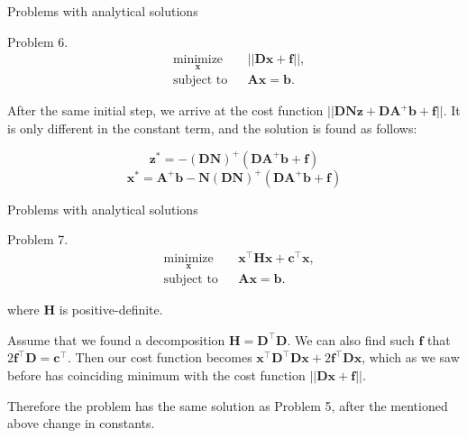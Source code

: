 \documentclass{beamer}
\begin{document}
\begin{frame}{Problems with analytical solutions}
\begin{flushleft}

Problem 6. 
%
\begin{equation}
\begin{aligned}
& \underset{\mathbf{x}}{\text{minimize}}
& & || \mathbf{D}\mathbf{x} + \mathbf{f} ||, \\
& \text{subject to}
& & \mathbf{A} \mathbf{x} = \mathbf{b}.
\end{aligned}
\end{equation}

After the same initial step, we arrive at the cost function $|| \mathbf{D}\mathbf{N}\mathbf{z} + \mathbf{D}\mathbf{A}^+\mathbf{b} + \mathbf{f}||$. It is only different in the constant term, and the solution is found as follows:


\begin{equation}
    \mathbf{z}^* = -(\mathbf{D}\mathbf{N})^+ (\mathbf{D}\mathbf{A}^+\mathbf{b} + \mathbf{f})
\end{equation}
\begin{equation}
    \mathbf{x}^* = \mathbf{A}^+\mathbf{b}-\mathbf{N}(\mathbf{D}\mathbf{N})^+ (\mathbf{D}\mathbf{A}^+\mathbf{b} + \mathbf{f})
\end{equation}


\end{flushleft}
\end{frame}



\begin{frame}{Problems with analytical solutions}
\begin{flushleft}

Problem 7. 
%
\begin{equation}
\begin{aligned}
& \underset{\mathbf{x}}{\text{minimize}}
& & \mathbf{x}^\top \mathbf{H} \mathbf{x} + \mathbf{c}^\top\mathbf{x}, \\
& \text{subject to}
& & \mathbf{A} \mathbf{x} = \mathbf{b}.
\end{aligned}
\end{equation}

where $\mathbf{H}$ is positive-definite.

\bigskip

Assume that we found a decomposition $\mathbf{H} = \mathbf{D}^\top\mathbf{D}$. We can also find such $\mathbf{f}$ that $2\mathbf{f}^\top\mathbf{D} = \mathbf{c}^\top$. Then our cost function becomes $\mathbf{x}^\top \mathbf{D}^\top\mathbf{D} \mathbf{x} + 2\mathbf{f}^\top\mathbf{D}\mathbf{x}$, which as we saw before has coinciding minimum with the cost function $||\mathbf{D}\mathbf{x} + \mathbf{f}||$.

\bigskip

Therefore the problem has the same solution as Problem 5, after the mentioned above change in constants.

\end{flushleft}
\end{frame}
\end{document}
